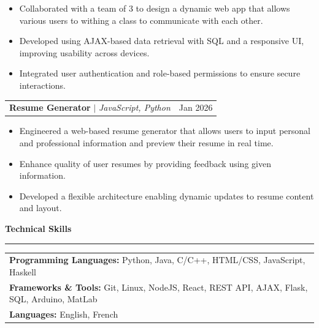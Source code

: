 \documentclass[letterpaper]{article}
\newcommand{\ressection}[1]{
    \vspace{1.0em}
    \noindent\textbf{\large #1}
    \par\vspace{0.3em}
    \hrule
    \vspace{0.6em}
}
\begin{document}
\vspace{-0.5em}

\begin{itemize}[leftmargin=2.5em, itemsep=-0.2em]
    \item Collaborated with a team of 3 to design a dynamic web app that allows various users to withing a class to communicate with each other.
    \item Developed using AJAX-based data retrieval with SQL and a responsive UI, improving usability across devices.
    \item Integrated user authentication and role-based permissions to ensure secure interactions.
\end{itemize}

\begin{tabularx}{\textwidth}{X r}
    \textbf{Resume Generator} $|$ \textit{JavaScript, Python} & Jan 2026 \\
\end{tabularx}

\vspace{-0.5em}

\begin{itemize}[leftmargin=2.5em, itemsep=-0.2em]
    \item Engineered a web-based resume generator that allows users to input personal and professional information and preview their resume in real time.
    \item Enhance quality of user resumes by providing feedback using given information.
    \item Developed a flexible architecture enabling dynamic updates to resume content and layout.
\end{itemize}

\ressection{Technical Skills}
\begin{tabularx}{\textwidth}{X}
    \textbf{Programming Languages:} Python, Java, C/C++, HTML/CSS, JavaScript, Haskell \\
    \textbf{Frameworks \& Tools:} Git, Linux, NodeJS, React, REST API, AJAX, Flask, SQL, Arduino, MatLab \\
    \textbf{Languages:} English, French \\
\end{tabularx}
\end{document}
